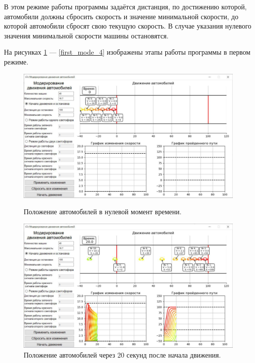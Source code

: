 \documentclass[12pt, a4paper]{extarticle}
\numberwithin{equation}{section}
\numberwithin{figure}{section}
\begin{document}
В этом режиме работы программы задаётся дистанция, по достижению которой, автомобили должны сбросить скорость и значение минимальной скорости, до которой автомобили сбросят свою текущую скорость. В случае указания нулевого значения минимальной скорости машины остановятся.

На рисунках \ref{first_mode_1} --- \ref{first_mode_4} изображены этапы работы программы в первом режиме.

\begin{figure}[h!]
	\begin{center}
		\begin{minipage}[h]{0.48\linewidth}
			\includegraphics[width=1\linewidth]
			{Images/screens/first_mode_1}
			\caption{Положение автомобилей в нулевой момент времени.} 
			\label{first_mode_1}
		\end{minipage}
		\hfill 
		\begin{minipage}[h]{0.48\linewidth}
			\includegraphics[width=1\linewidth]
			{Images/screens/first_mode_2}
			\caption{Положение автомобилей через 20 секунд после начала движения.}

\end{minipage}
\end{center}
\end{figure}
\end{document}
